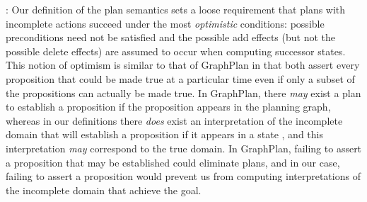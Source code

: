 \documentclass[letterpaper]{article}
\def\und#1{\noindent{\bf #1}:}
\def\citep#1{\cite{#1}}
\begin{document}

  


%
%



\und{Discussion} Our definition of the plan semantics sets a loose requirement
that plans with incomplete actions succeed under the most  {\em optimistic} conditions:  possible
preconditions need not be satisfied and the possible add effects (but not the
possible delete effects) are assumed to occur when computing successor states.  
This notion of optimism is similar to that of GraphPlan \citep{graphplan} in
that  both assert every proposition that could be made true at a particular time
even if only a subset of the propositions can actually be made true.  In
GraphPlan, there {\em may} exist a plan to establish a proposition if the
proposition appears in the planning graph, whereas in our definitions there {\em
does} exist an interpretation of the incomplete domain that will establish a
proposition if it appears in a state \citep{USU-CS-TR-11-001}, and this interpretation {\em
may} correspond to the true domain. In GraphPlan, failing to assert a proposition that may be
established could eliminate plans, and in our case, failing to assert a proposition would prevent us from computing interpretations of the incomplete
domain that achieve the goal.
\end{document}

